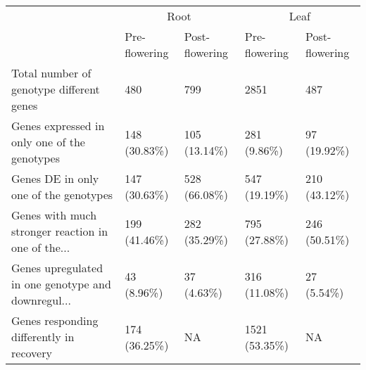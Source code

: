 \begin{tabular}{lllll}
\toprule
{} & \multicolumn{2}{c}{Root} & \multicolumn{2}{c}{Leaf} \\
{} & Pre-flowering & Post-flowering &  Pre-flowering & Post-flowering \\
\midrule
Total number of genotype different genes           &           480 &            799 &           2851 &            487 \\
Genes expressed in only one of the genotypes       &  148 (30.83\%) &   105 (13.14\%) &    281 (9.86\%) &    97 (19.92\%) \\
Genes DE in only one of the genotypes              &  147 (30.63\%) &   528 (66.08\%) &   547 (19.19\%) &   210 (43.12\%) \\
Genes with much stronger reaction in one of the... &  199 (41.46\%) &   282 (35.29\%) &   795 (27.88\%) &   246 (50.51\%) \\
Genes upregulated in one genotype and downregul... &    43 (8.96\%) &     37 (4.63\%) &   316 (11.08\%) &     27 (5.54\%) \\
Genes responding differently in recovery           &  174 (36.25\%) &             NA &  1521 (53.35\%) &             NA \\
\bottomrule
\end{tabular}
